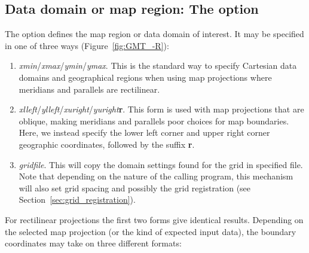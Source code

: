 \subsection{Data domain or map region: The  option}
\label{sec:R}

The  option defines the map region or data domain of interest.  It may be specified
in one of three ways (Figure~\ref{fig:GMT_-R}):
\begin{enumerate}
\item {}\emph{xmin}/\emph{xmax}/\emph{ymin}/\emph{ymax}.  This is the standard way to specify
Cartesian data domains and geographical regions when using map projections where meridians and
parallels are rectilinear.
\item {}\emph{xlleft}/\emph{ylleft}/\emph{xuright}/\emph{yuright}\textbf{r}.
This form is used with map projections that are oblique, making meridians and parallels poor
choices for map boundaries.  Here, we instead specify the lower left corner and upper right
corner geographic coordinates, followed by the suffix \textbf{r}.
\item {}\emph{gridfile}.  This will copy the domain settings found for the grid in specified
file.  Note that depending on the nature of the calling program, this mechanism will also set grid spacing
and possibly the grid registration (see Section~\ref{sec:grid_registration}).
\end{enumerate}
For rectilinear projections the first two forms give identical results.  Depending on the selected map
projection (or the kind of expected input data), the boundary coordinates may take on three different
formats:

